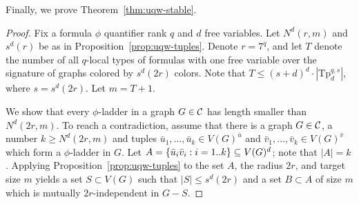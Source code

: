 Finally, we prove Theorem~\ref{thm:uqw-stable}. 
\begin{proof}  

Fix a formula  $\phi$ quantifier rank $q$ and $d$ free variables.
Let $N^d(r,m)$ and $s^d(r)$ be as in Proposition~\ref{prop:uqw-tuples}.
Denote $r=  7^q$, 
and let $T$ denote the number of all $q$-local types of 
formulas with one free variable over the signature of  graphs colored by $s^d(2r)$ colors. Note that $T\le (s+d)^d\cdot |\mathrm{Tp}_d^{q,s}|$, where $s=s^d(2r)$.
Let $m=T+1$. 

We show that 
every $\phi$-ladder in a graph $G\in\cal C$ has length smaller than $N^d(2r,m)$. 
To reach a contradiction, assume that there is a graph $G\in\cal C$, a number $k\ge N^d(2r,m)$
and tuples $\bar u_1,\ldots,\bar u_k\in V(G)^{\bar u}$ and $\bar v_1,\ldots,\bar v_k\in V(G)^{\bar v}$
which form a $\phi$-ladder in $G$.
	Let $A=\set{\bar u_i\bar v_i: i=1..k}\subset V(G)^d$; note that $|A|=k$.
Applying Proposition~\ref{prop:uqw-tuples} to the set $A$, the radius $2r$, and target size $m$
		 yields a set $S\subset V(G)$ such that $|S|\le s^d(2r)$
	and a set $B\subset A$ of size $m$ which is mutually $2r$-independent in $G-S$.
%
%
%

\end{proof}
